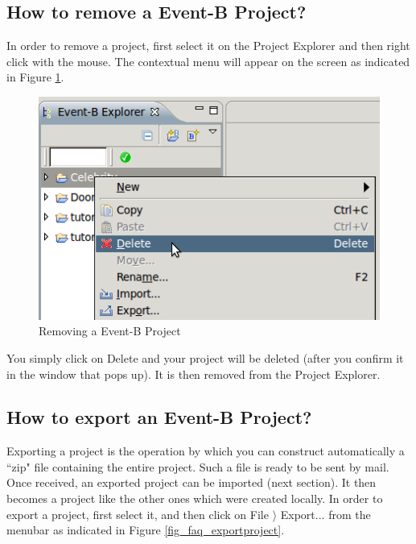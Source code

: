\subsection{How to remove a Event-B Project?}

In order to remove a project, first select it on the \textsf{Project Explorer} and then right click with the mouse. The contextual menu will appear on the screen as indicated in Figure \ref{fig_faq_removeproject}.

\begin{figure}[!ht]
\begin{center}
	\includegraphics{img/faq/faq_removeproject.png}
	\caption{Removing a Event-B Project}
	\label{fig_faq_removeproject}
\end{center}
\end{figure}

You simply click on \textsf{Delete} and your project will be deleted (after you confirm it in the window that pops up). It is then removed from the \textsf{Project Explorer}.

\subsection{How to export an Event-B Project?}

Exporting a project is the operation by which you can construct automatically a ``zip" file containing the entire project. Such a file is ready to be sent by mail. Once received, an exported project can be imported (next section). It then becomes a project like the other ones which were created locally. In order to export a project, first select it, and then click on \textsf{File $\rangle$ Export...} from the menubar as indicated in Figure \ref{fig_faq_exportproject}. 

